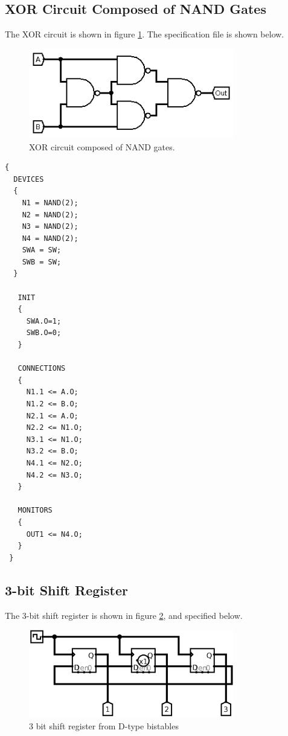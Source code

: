 \documentclass[a4paper,11pt]{article}  %
\begin{document}
\subsection{XOR Circuit Composed of NAND Gates}

The XOR circuit is shown in figure \ref{fig:xornand}. The
specification file is shown below.

\begin{figure}[!h]
  \begin{center}
    \includegraphics[width=0.8\textwidth]{XORfromNAND.png}
  \end{center}
  \caption{XOR circuit composed of NAND gates.}
  \label{fig:xornand}
\end{figure}

\begin{lstlisting}
{
  DEVICES
  {
    N1 = NAND(2);
    N2 = NAND(2);
    N3 = NAND(2);
    N4 = NAND(2);
    SWA = SW;
    SWB = SW;
  }

   INIT
   {
     SWA.O=1;
     SWB.O=0;
   }

   CONNECTIONS
   {
     N1.1 <= A.O;
     N1.2 <= B.O;
     N2.1 <= A.O;
     N2.2 <= N1.O;
     N3.1 <= N1.O;
     N3.2 <= B.O;
     N4.1 <= N2.O;
     N4.2 <= N3.O;
   }

   MONITORS
   {
     OUT1 <= N4.O;
   }
 }

\end{lstlisting}

\subsection{3-bit Shift Register}

The 3-bit shift register is shown in figure \ref{fig:3bitsr}, and
specified below.

\begin{figure}[!h]
  \begin{center}
    \includegraphics[width=0.8\textwidth]{3bitGrayCounter.png}
  \end{center}
  \caption{3 bit shift register from D-type bistables}
  \label{fig:3bitsr}
\end{figure}
\end{document}
